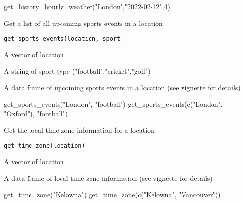 \documentclass[a4paper]{book}
\begin{document}
%
\begin{Examples}
\begin{ExampleCode}
get_history_hourly_weather("London","2022-02-12",4)
\end{ExampleCode}
\end{Examples}
%
\begin{Description}\relax
Get a list of all upcoming sports events in a location
\end{Description}
%
\begin{Usage}
\begin{verbatim}
get_sports_events(location, sport)
\end{verbatim}
\end{Usage}
%
\begin{Arguments}
\begin{ldescription}
\item[\code{location}] A vector of location

\item[\code{sport}] A string of sport type ("football","cricket","golf")
\end{ldescription}
\end{Arguments}
%
\begin{Value}
A data frame of upcoming sports events in a location (see vignette for details)
\end{Value}
%
\begin{Examples}
\begin{ExampleCode}
get_sports_events("London", "football")
get_sports_events(c("London", "Oxford"), "football")
\end{ExampleCode}
\end{Examples}
%
\begin{Description}\relax
Get the local time-zone information for a location
\end{Description}
%
\begin{Usage}
\begin{verbatim}
get_time_zone(location)
\end{verbatim}
\end{Usage}
%
\begin{Arguments}
\begin{ldescription}
\item[\code{location}] A vector of location
\end{ldescription}
\end{Arguments}
%
\begin{Value}
A data frame of local time-zone information (see vignette for details)
\end{Value}
%
\begin{Examples}
\begin{ExampleCode}
get_time_zone("Kelowna")
get_time_zone(c("Kelowna", "Vancouver"))
\end{ExampleCode}
\end{Examples}
\printindex{}
\end{document}
